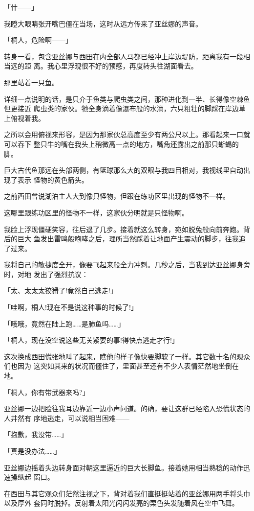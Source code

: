 \documentclass[11pt]{book}
\begin{document}
「什——」

我瞪大眼睛张开嘴巴僵在当场，这时从远方传来了亚丝娜的声音。

「桐人，危险啊——」

转身一看，包含亚丝娜与西田在内全部人马都已经冲上岸边堤防，距离我有一段相当远的距
离。我心里浮现很不好的预感，再度转头往湖面看去。

那里站着一只鱼。

详细一点说明的话，是只介于鱼类与爬虫类之间，那种进化到一半、长得像空棘鱼但更接近
爬虫类的家伙。牠全身滴着像瀑布般的水滴，六只粗壮的脚踩在岸边草上俯视着我。

之所以会用俯视来形容，是因为那家伙总高度至少有两公尺以上。那看起来一口就可以吞下
整只牛的嘴在我头上稍微高一点的地方，嘴角还露出之前那只蜥蜴的脚。

巨大古代鱼那远在头部两侧，有篮球那么大的双眼与我四目相对，我视线里自动出现了表示
怪物的黄色箭头。

之前西田曾说湖泊主人大到像只怪物，但跟在练功区里出现的怪物不一样。

这哪里跟练功区里的怪物不一样，这家伙分明就是只怪物啊。

我脸上浮现僵硬笑容，往后退了几步。接着就这么转身，宛如脱兔般向前奔跑。背后的巨大
鱼发出雷鸣般咆哮之后，理所当然踩着让地面产生震动的脚步，往我追了过来。

我将自己的敏捷度全开，像要飞起来般全力冲刺。几秒之后，当我到达亚丝娜身旁时，对地
发出了强烈抗议：

「太、太太太狡猾了!竟然自己逃走!」

「哇啊，桐人!现在不是说这种事的时候了!」

「哦哦，竟然在陆上跑……是肺鱼吗……」

「桐人，现在没空说这些无关紧要的事!得快点逃走才行!」

这次换成西田慌张地叫了起来，瞧他的样子像快要脚软了一样。其它数十名的观众们也因为
这突如其来的状况而僵住了，里面甚至还有不少人表情茫然地坐倒在地。

「桐人，你有带武器来吗?」

亚丝娜一边把脸往我耳边靠近一边小声问道。的确，要让这群已经陷入恐慌状态的人井然有
序地逃走，可以说相当困难——

「抱歉，我没带……」

「真是没办法……」

亚丝娜边摇着头边转身面对朝这里逼近的巨大长脚鱼。接着她用相当熟稔的动作迅速操纵起
窗口。

在西田与其它观众们茫然注视之下，背对着我们直挺挺站着的亚丝娜用两手将头巾以及厚外
套同时脱掉。反射着太阳光闪闪发亮的栗色头发随着风在空中飞舞。
\end{document}
